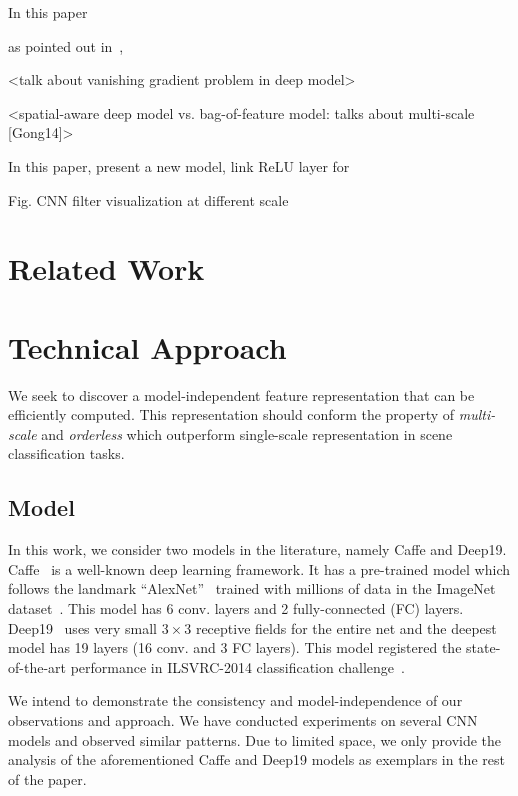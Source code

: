 \documentclass[10pt,twocolumn,letterpaper]{article}
\begin{document}
In this paper



as pointed out in~\cite{Gong14}, 

<talk about vanishing gradient problem in deep model>

<spatial-aware deep model vs. bag-of-feature model: talks about multi-scale [Gong14]>

In this paper, present a new model, link ReLU layer for 


Fig. CNN filter visualization at different scale 

\section{Related Work}


\section{Technical Approach}

We seek to discover a model-independent feature representation that can be efficiently computed. This representation should conform the property of \textit{multi-scale} and \textit{orderless} which outperform single-scale representation in scene classification tasks. 

\subsection{Model}

In this work, we consider two models in the literature, namely Caffe and Deep19. Caffe~\cite{Caffe} is a well-known deep learning framework. It has a pre-trained model which follows the landmark ``AlexNet''~\cite{AlexNet} trained with millions of data in the ImageNet dataset~\cite{ImageNet}. This model has 6 conv. layers and 2 fully-connected (FC) layers. Deep19~\cite{veryDeep} uses very small $3\times 3$ receptive fields for the entire net and the deepest model has 19 layers (16 conv. and 3 FC layers). This model registered the state-of-the-art performance in ILSVRC-2014 classification challenge~\cite{ILSVRC14}. 

We intend to demonstrate the consistency and model-independence of our observations and approach. We have conducted experiments on several CNN models and observed similar patterns. Due to limited space, we only provide the analysis of the aforementioned Caffe and Deep19 models as exemplars in the rest of the paper. 
\end{document}
